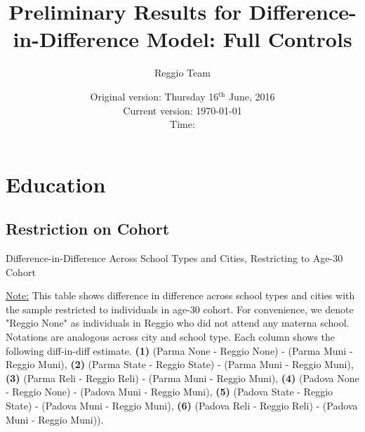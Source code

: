 \documentclass[11pt]{article}
\begin{document}
\title{Preliminary Results for Difference-in-Difference Model: Full Controls}
\author{Reggio Team}
\date{Original version: Thursday  16$^{\text{th}}$ June, 2016 \\ Current version: \today \\ \vspace{1em} Time: \currenttime}
\maketitle

\listoftables

\doublespacing

\section{Education}
\subsection{Restriction on Cohort}
\begin{table}[H]
\begin{center}
	\caption{Difference-in-Difference Across School Types and Cities, Restricting to Age-30 Cohort}
	\scalebox{0.80}{
		}
\end{center}
\footnotesize
\underline{Note:} This table shows difference in difference across school types and cities with the sample restricted to individuals in age-30 cohort. For convenience, we denote "Reggio None" as individuals in Reggio who did not attend any materna school. Notations are analogous across city and school type. Each column shows the following diff-in-diff estimate. \textbf{(1)} (Parma None - Reggio None) - (Parma Muni - Reggio Muni), \textbf{(2)} (Parma State - Reggio State) - (Parma Muni - Reggio Muni), \textbf{(3)} (Parma Reli - Reggio Reli) - (Parma Muni - Reggio Muni), \textbf{(4)} (Padova None - Reggio None) - (Padova Muni - Reggio Muni),  \textbf{(5)} (Padova State - Reggio State) - (Padova Muni - Reggio Muni), \textbf{(6)} (Padova Reli - Reggio Reli) - (Padova Muni - Reggio Muni)). 
\end{table}
\end{document}
